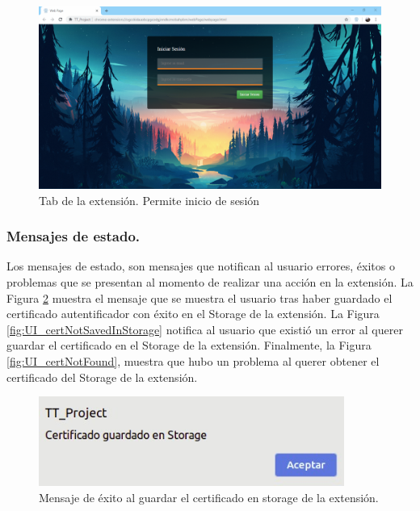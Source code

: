 \documentclass[12pt, a4paper, titlepage]{report}
\begin{document}
    		    \begin{figure}[H]
    				\begin{center}	\includegraphics[width=15cm]{./imagenes/Disenio/Componente_1/UI_webpage.PNG}
    					\caption{Tab de la extensión. Permite inicio de sesión}
    					\label{fig:CI_Tab}
    				\end{center}
    			\end{figure}
    			
    			\subsubsection{Mensajes de estado.}
    			Los mensajes de estado, son mensajes que notifican al usuario errores, éxitos o problemas que se presentan al momento de realizar una acción en la extensión. La Figura \ref{fig:UI_certSavedInStorage} muestra el mensaje que se muestra el usuario tras haber guardado el certificado autentificador con éxito en el Storage de la extensión. La Figura \ref{fig:UI_certNotSavedInStorage} notifica al usuario que existió un error al querer guardar el certificado en el Storage de la extensión. Finalmente, la Figura \ref{fig:UI_certNotFound}, muestra que hubo un problema al querer obtener el certificado del Storage de la extensión. 
    			
    			\begin{figure}[H]
    				\begin{center}	\includegraphics[width=10cm]{./imagenes/Disenio/Componente_1/UI_certSavedInStorage.jpeg}
    					\caption[Mensaje de éxito]{Mensaje de éxito al guardar el certificado en storage de la extensión.}
    					\label{fig:UI_certSavedInStorage}
    				\end{center}
    			\end{figure}
    			
\end{document}
